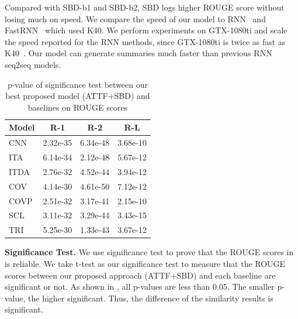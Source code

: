 Compared with SBD-b1 and SBD-b2,
SBD logs higher ROUGE score without losing much on speed. 
We compare the speed of our model to RNN~\citep{SeeLM17} and FastRNN~\citep{P18-1063}
which used K40. 
We perform experiments on GTX-1080ti and scale the speed 
reported for the RNN methods,
since GTX-1080ti is twice as fast as K40~\citep{gehring2017convs2s}.
Our model can 
generate summaries much faster than previous RNN seq2seq models.

\begin{table}[th!]
\begin{center}
\small
\caption{p-value of significance test between 
our best proposed model (ATTF+SBD) and baselines on ROUGE scores}
		\begin{tabular}{|l|c|c|c|}
		\hline
		Model &   R-1 & R-2 & R-L \\
		\hline
		CNN &  2.32e-35 & 6.34e-48 & 3.68e-10 \\
		ITA &  6.14e-34 & 2.12e-48 & 5.67e-12 \\
		ITDA & 2.76e-32 & 4.52e-44 & 3.94e-12 \\
		COV	& 4.14e-30 & 4.61e-50 & 7.12e-12 \\
		COVP & 2.51e-32 & 3.17e-41 & 2.15e-10 \\
		SCL	& 3.11e-32 & 3.29e-44 & 3.43e-15 \\
		TRI & 5.25e-30 & 1.33e-43 & 3.67e-12 \\
		\hline
		\end{tabular}
\label{tab:ttest}
\end{center}
\end{table}

\textbf{Significance Test.} We use significance test to prove that the ROUGE scores in  is reliable.
We take t-test 
\citep{loukina2014automatic,albert2017exploring}
as our significance test to
measure that the ROUGE scores between our proposed approach (ATTF+SBD) and each baseline are significant or not. 
As shown in ,
all p-values are less than 0.05. 
The smaller p-value, the higher significant.
Thus, the difference of the similarity results is significant. 
				

